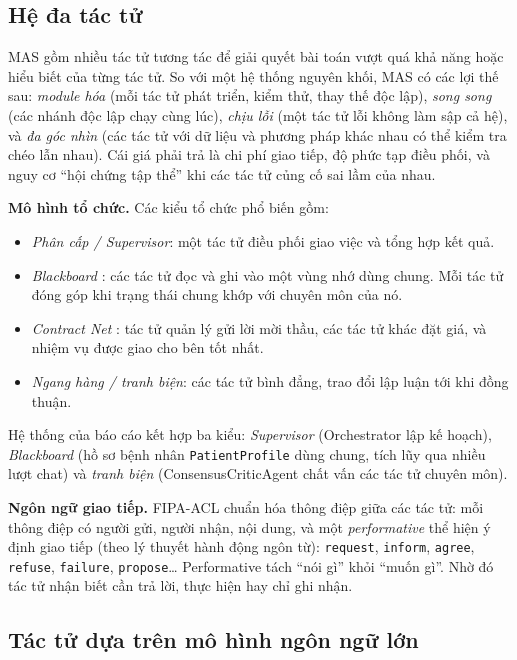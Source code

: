 \subsection{Hệ đa tác tử}

MAS gồm nhiều tác tử tương tác để giải quyết bài toán vượt quá khả năng hoặc hiểu biết của từng tác tử. So với một hệ thống nguyên khối, MAS có các lợi thế sau: \emph{module hóa} (mỗi tác tử phát triển, kiểm thử, thay thế độc lập), \emph{song song} (các nhánh độc lập chạy cùng lúc), \emph{chịu lỗi} (một tác tử lỗi không làm sập cả hệ), và \emph{đa góc nhìn} (các tác tử với dữ liệu và phương pháp khác nhau có thể kiểm tra chéo lẫn nhau). Cái giá phải trả là chi phí giao tiếp, độ phức tạp điều phối, và nguy cơ ``hội chứng tập thể'' khi các tác tử củng cố sai lầm của nhau.

\textbf{Mô hình tổ chức.} Các kiểu tổ chức phổ biến gồm:
\begin{itemize}
  \item \emph{Phân cấp / Supervisor}: một tác tử điều phối giao việc và tổng hợp kết quả.
  \item \emph{Blackboard} \cite{hayesroth1985}: các tác tử đọc và ghi vào một vùng nhớ dùng chung. Mỗi tác tử đóng góp khi trạng thái chung khớp với chuyên môn của nó.
  \item \emph{Contract Net} \cite{smith1980}: tác tử quản lý gửi lời mời thầu, các tác tử khác đặt giá, và nhiệm vụ được giao cho bên tốt nhất.
  \item \emph{Ngang hàng / tranh biện}: các tác tử bình đẳng, trao đổi lập luận tới khi đồng thuận.
\end{itemize}
Hệ thống của báo cáo kết hợp ba kiểu: \emph{Supervisor} (Orchestrator lập kế hoạch), \emph{Blackboard} (hồ sơ bệnh nhân \texttt{PatientProfile} dùng chung, tích lũy qua nhiều lượt chat) và \emph{tranh biện} (ConsensusCriticAgent chất vấn các tác tử chuyên môn).

\textbf{Ngôn ngữ giao tiếp.} FIPA-ACL \cite{fipa2002} chuẩn hóa thông điệp giữa các tác tử: mỗi thông điệp có người gửi, người nhận, nội dung, và một \emph{performative} thể hiện ý định giao tiếp (theo lý thuyết hành động ngôn từ): \texttt{request}, \texttt{inform}, \texttt{agree}, \texttt{refuse}, \texttt{failure}, \texttt{propose}\ldots{} Performative tách ``nói gì'' khỏi ``muốn gì''. Nhờ đó tác tử nhận biết cần trả lời, thực hiện hay chỉ ghi nhận.

\subsection{Tác tử dựa trên mô hình ngôn ngữ lớn}

